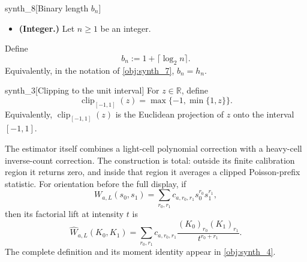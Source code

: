 \begin{definitionv}{synth_8}[Binary length \(b_n\)]
\begin{itemize}
\item \textbf{(Integer.)} Let \(n\ge1\) be an integer.
\end{itemize}
Define
\[
b_n:=1+\lceil\log_2 n\rceil .
\]
Equivalently, in the notation of \cref{obj:synth_7}, \(b_n=h_n\).
\end{definitionv}

\begin{definitionv}{synth_3}[Clipping to the unit interval]
For \(z\in\mathbb R\), define
\[
\operatorname{clip}_{[-1,1]}(z)
=
\max\{-1,\min\{1,z\}\}.
\]
Equivalently, \(\operatorname{clip}_{[-1,1]}(z)\) is the Euclidean projection of \(z\) onto the interval \([-1,1]\).
\end{definitionv}

The estimator itself combines a light-cell polynomial correction with a heavy-cell inverse-count correction. The construction is total: outside its finite calibration region it returns zero, and inside that region it averages a clipped Poisson-prefix statistic. For orientation before the full display, if
\[
W_{a,L}(s_0,s_1)=\sum_{r_0,r_1}c_{a,r_0,r_1}s_0^{r_0}s_1^{r_1},
\]
then its factorial lift at intensity \(t\) is
\[
\widehat W_{a,L}(K_0,K_1)
=
\sum_{r_0,r_1}c_{a,r_0,r_1}
\frac{(K_0)_{r_0}(K_1)_{r_1}}{t^{r_0+r_1}}.
\]
The complete definition and its moment identity appear in \cref{obj:synth_4}.

